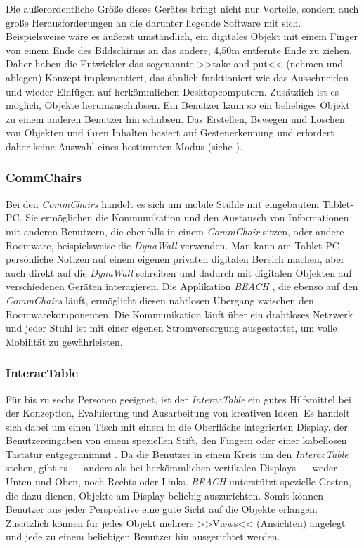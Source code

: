 Die außerordentliche Größe dieses Gerätes bringt nicht nur Vorteile, sondern auch große Herausforderungen an die darunter liegende Software mit sich. Beispielsweise wäre es äußerst umständlich, ein digitales Objekt mit einem Finger von einem Ende des Bildschirms an das andere, 4,50m entfernte Ende zu ziehen. Daher haben die Entwickler das sogenannte >>take and put<< (nehmen und ablegen) Konzept implementiert, das ähnlich funktioniert wie das Ausschneiden und wieder Einfügen auf herkömmlichen Desktopcomputern. Zusätzlich ist es möglich, Objekte herumzuschubsen. Ein Benutzer kann so ein beliebiges Objekt zu einem anderen Benutzer hin schubsen. Das Erstellen, Bewegen und Löschen von Objekten und ihren Inhalten basiert auf Gestenerkennung und erfordert daher keine Auswahl eines bestimmten Modus (siehe ).

\subsubsection{CommChairs}

Bei den \emph{CommChairs} handelt es sich um mobile Stühle mit eingebautem Tablet-PC. Sie ermöglichen die Kommunikation und den Austausch von Informationen mit anderen Benutzern, die ebenfalls in einem \emph{CommChair} sitzen, oder andere Roomware, beispielsweise die \emph{DynaWall} verwenden. Man kann am Tablet-PC persönliche Notizen auf einem eigenen privaten digitalen Bereich machen, aber auch direkt auf die \emph{DynaWall} schreiben und dadurch mit digitalen Objekten auf verschiedenen Geräten interagieren. Die Applikation \emph{BEACH} \citep{Tandler:2000p238}, die ebenso auf den \emph{CommChairs} läuft, ermöglicht diesen nahtlosen Übergang zwischen den Roomwarekomponenten. Die Kommunikation läuft über ein drahtloses Netzwerk und jeder Stuhl ist mit einer eigenen Stromversorgung ausgestattet, um volle Mobilität zu gewährleisten.

\subsubsection{InteracTable}

Für bis zu sechs Personen geeignet, ist der \emph{InteracTable} ein gutes Hilfsmittel bei der Konzeption, Evaluierung und Ausarbeitung von kreativen Ideen. Es handelt sich dabei um einen Tisch mit einem in die Oberfläche integrierten Display, der Benutzereingaben von einem speziellen Stift, den Fingern oder einer kabellosen Tastatur entgegennimmt \citep{Streitz:2001p213}. Da die Benutzer in einem Kreis um den \emph{InteracTable} stehen, gibt es — anders als bei herkömmlichen vertikalen Displays — weder Unten und Oben, noch Rechts oder Links. \emph{BEACH} unterstützt spezielle Gesten, die dazu dienen, Objekte am Display beliebig auszurichten. Somit können Benutzer aus jeder Perspektive eine gute Sicht auf die Objekte erlangen. Zusätzlich können für jedes Objekt mehrere >>Views<< (Ansichten) angelegt und jede zu einem beliebigen Benutzer hin ausgerichtet werden. 

